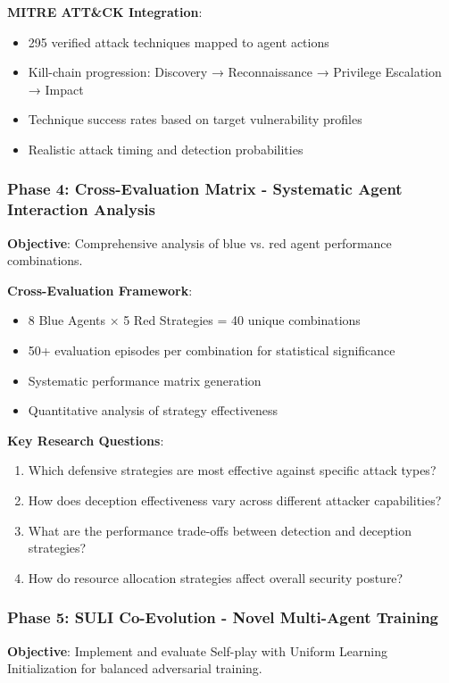 \documentclass[11pt]{article}
\theoremstyle{definition}
\theoremstyle{plain}
\begin{document}
\textbf{MITRE ATT\&CK Integration}:
\begin{itemize}
\item 295 verified attack techniques mapped to agent actions
\item Kill-chain progression: Discovery → Reconnaissance → Privilege Escalation → Impact
\item Technique success rates based on target vulnerability profiles
\item Realistic attack timing and detection probabilities
\end{itemize}

\subsubsection{Phase 4: Cross-Evaluation Matrix - Systematic Agent Interaction Analysis}
\textbf{Objective}: Comprehensive analysis of blue vs. red agent performance combinations.

\textbf{Cross-Evaluation Framework}:
\begin{itemize}
\item 8 Blue Agents × 5 Red Strategies = 40 unique combinations
\item 50+ evaluation episodes per combination for statistical significance
\item Systematic performance matrix generation
\item Quantitative analysis of strategy effectiveness
\end{itemize}

\textbf{Key Research Questions}:
\begin{enumerate}
\item Which defensive strategies are most effective against specific attack types?
\item How does deception effectiveness vary across different attacker capabilities?
\item What are the performance trade-offs between detection and deception strategies?
\item How do resource allocation strategies affect overall security posture?
\end{enumerate}

\subsubsection{Phase 5: SULI Co-Evolution - Novel Multi-Agent Training}
\textbf{Objective}: Implement and evaluate Self-play with Uniform Learning Initialization for balanced adversarial training.
\end{document}

